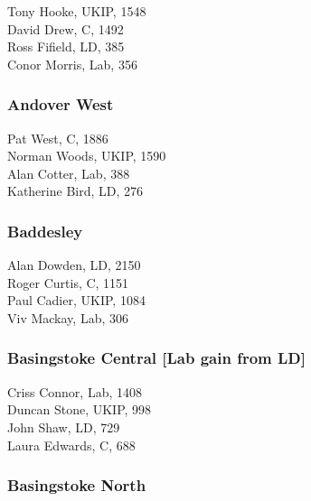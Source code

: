\documentclass[a4paper,openany,10pt]{book}
\begin{document}


Tony Hooke, UKIP, 1548\\
David Drew, C, 1492\\
Ross Fifield, LD, 385\\
Conor Morris, Lab, 356\\


\subsubsection*{Andover West}



Pat West, C, 1886\\
Norman Woods, UKIP, 1590\\
Alan Cotter, Lab, 388\\
Katherine Bird, LD, 276\\


\subsubsection*{Baddesley}



Alan Dowden, LD, 2150\\
Roger Curtis, C, 1151\\
Paul Cadier, UKIP, 1084\\
Viv Mackay, Lab, 306\\


\subsubsection*{Basingstoke Central \hspace*{\fill}\nolinebreak[1]%
\enspace\hspace*{\fill}
[Lab gain from LD]}



Criss Connor, Lab, 1408\\
Duncan Stone, UKIP, 998\\
John Shaw, LD, 729\\
Laura Edwards, C, 688\\


\subsubsection*{Basingstoke North}
\end{document}
